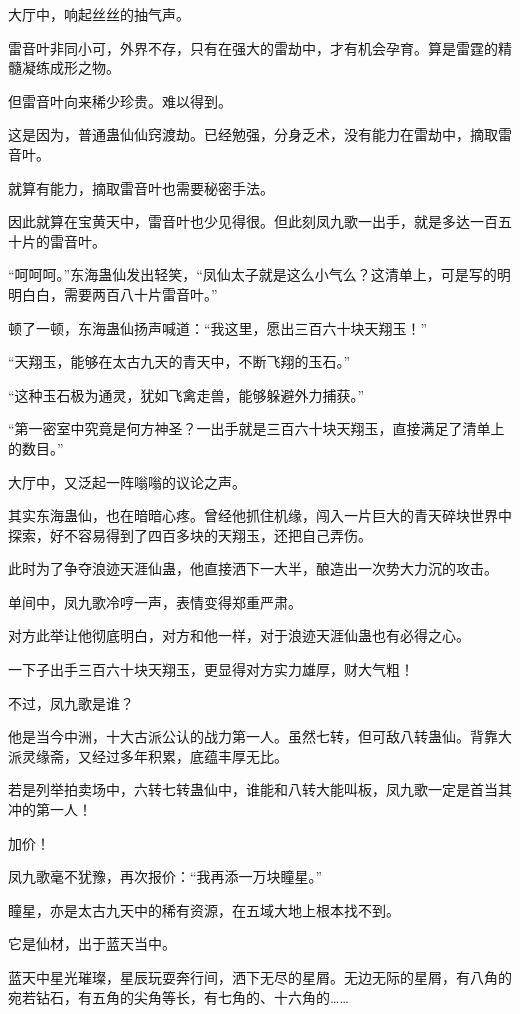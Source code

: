 \begin{this_body}
大厅中，响起丝丝的抽气声。

雷音叶非同小可，外界不存，只有在强大的雷劫中，才有机会孕育。算是雷霆的精髓凝练成形之物。

但雷音叶向来稀少珍贵。难以得到。

这是因为，普通蛊仙仙窍渡劫。已经勉强，分身乏术，没有能力在雷劫中，摘取雷音叶。

就算有能力，摘取雷音叶也需要秘密手法。

因此就算在宝黄天中，雷音叶也少见得很。但此刻凤九歌一出手，就是多达一百五十片的雷音叶。

“呵呵呵。”东海蛊仙发出轻笑，“凤仙太子就是这么小气么？这清单上，可是写的明明白白，需要两百八十片雷音叶。”

顿了一顿，东海蛊仙扬声喊道：“我这里，愿出三百六十块天翔玉！”

“天翔玉，能够在太古九天的青天中，不断飞翔的玉石。”

“这种玉石极为通灵，犹如飞禽走兽，能够躲避外力捕获。”

“第一密室中究竟是何方神圣？一出手就是三百六十块天翔玉，直接满足了清单上的数目。”

大厅中，又泛起一阵嗡嗡的议论之声。

其实东海蛊仙，也在暗暗心疼。曾经他抓住机缘，闯入一片巨大的青天碎块世界中探索，好不容易得到了四百多块的天翔玉，还把自己弄伤。

此时为了争夺浪迹天涯仙蛊，他直接洒下一大半，酿造出一次势大力沉的攻击。

单间中，凤九歌冷哼一声，表情变得郑重严肃。

对方此举让他彻底明白，对方和他一样，对于浪迹天涯仙蛊也有必得之心。

一下子出手三百六十块天翔玉，更显得对方实力雄厚，财大气粗！

不过，凤九歌是谁？

他是当今中洲，十大古派公认的战力第一人。虽然七转，但可敌八转蛊仙。背靠大派灵缘斋，又经过多年积累，底蕴丰厚无比。

若是列举拍卖场中，六转七转蛊仙中，谁能和八转大能叫板，凤九歌一定是首当其冲的第一人！

加价！

凤九歌毫不犹豫，再次报价：“我再添一万块瞳星。”

瞳星，亦是太古九天中的稀有资源，在五域大地上根本找不到。

它是仙材，出于蓝天当中。

蓝天中星光璀璨，星辰玩耍奔行间，洒下无尽的星屑。无边无际的星屑，有八角的宛若钻石，有五角的尖角等长，有七角的、十六角的……


\end{this_body}
